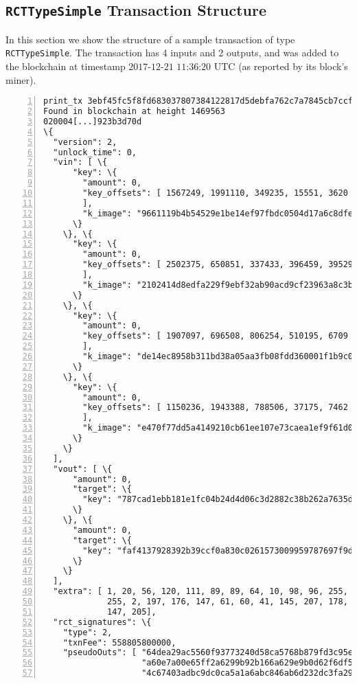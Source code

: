 \begin{appendices}
\chapter{{\tt RCTTypeSimple} Transaction Structure}
\label{appendix:RCTTypeSimple}


In this section we show the structure of a sample transaction of type {\tt RCTTypeSimple}. The transaction has 4 inputs and 2 outputs, and was added to the blockchain at timestamp \( \textrm{2017-12-21 11:36:20 UTC} \) (as reported by its block's miner).


\begin{Verbatim}[commandchars=\\\{\}, numbers=left]
print_tx 3ebf45fc5f8fd683037807384122817d5debfa762c7a7845cb7ccfe9ee20940b 
Found in blockchain at height 1469563
020004[...]923b3d70d
\{
  "version": 2, 
  "unlock_time": 0, 
  "vin": [ \{
      "key": \{
        "amount": 0, 
        "key_offsets": [ 1567249, 1991110, 349235, 15551, 3620
        ], 
        "k_image": "9661119b4b54529e1be14ef97fbdc0504d17a6c8dfedd55d2455b93a6336bb41"
      \}
    \}, \{
      "key": \{
        "amount": 0, 
        "key_offsets": [ 2502375, 650851, 337433, 396459, 39529
        ], 
        "k_image": "2102414d8edfa229f9ebf32ab90acd9cf23963a8c3b6ba0e181fc1d5782c046c"
      \}
    \}, \{
      "key": \{
        "amount": 0, 
        "key_offsets": [ 1907097, 696508, 806254, 510195, 6709
        ], 
        "k_image": "de14ec8958b311bd38a05aa3fb08fdd360001f1b9c060264eecdd8c08c9e83c4"
      \}
    \}, \{
      "key": \{
        "amount": 0, 
        "key_offsets": [ 1150236, 1943388, 788506, 37175, 7462
        ], 
        "k_image": "e470f77dd5a4149210cb61ee107e73caea1ef9f61d05384e3bd4372fdc85bf17"
      \}
    \}
  ], 
  "vout": [ \{
      "amount": 0, 
      "target": \{
        "key": "787cad1ebb181e1fc04b24d4d06c3d2882c38b262a7635de8ad487c536e40a12"
      \}
    \}, \{
      "amount": 0, 
      "target": \{
        "key": "faf4137928392b39ccf0a830c0261573009959787697f9d4fb769c25781fb911"
      \}
    \}
  ], 
  "extra": [ 1, 20, 56, 120, 111, 89, 89, 64, 10, 98, 96, 255, 202, 235, 203, 
             255, 2, 197, 176, 147, 61, 60, 41, 145, 207, 178, 212, 71, 37, 69, 19, 
             147, 205], 
  "rct_signatures": \{
    "type": 2, 
    "txnFee": 558805800000, 
    "pseudoOuts": [ "64dea29ac5560f93773240d58ca5768b879fd3c95e0b3b50a80ec36a6ff3a6da",
                    "a60e7a00e65ff2a6299b92b166a629e9b0d62f6df50e40535140716757efe4c0", 
                    "4c67403adbc9dc0ca5a1a6abc846ab6d232dc3fa295099b3c7a9d005bac60eba", 

\end{Verbatim}
\end{appendices}
